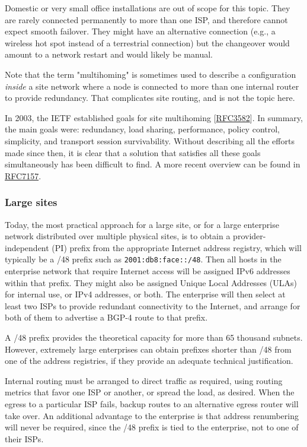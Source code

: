 \documentclass[
]{article}
\begin{document}
Domestic or very small office installations are out of scope for this
topic. They are rarely connected permanently to more than one ISP, and
therefore cannot expect smooth failover. They might have an alternative
connection (e.g., a wireless hot spot instead of a terrestrial
connection) but the changeover would amount to a network restart and
would likely be manual.

Note that the term "multihoming" is sometimes used to describe a
configuration \emph{inside} a site network where a node is connected to
more than one internal router to provide redundancy. That complicates
site routing, and is not the topic here.

In 2003, the IETF established goals for site multihoming
{[}\href{https://www.rfc-editor.org/info/rfc3582}{RFC3582}{]}. In
summary, the main goals were: redundancy, load sharing, performance,
policy control, simplicity, and transport session survivability. Without
describing all the efforts made since then, it is clear that a solution
that satisfies all these goals simultaneously has been difficult to
find. A more recent overview can be found in
\href{https://www.rfc-editor.org/info/rfc7157}{RFC7157}.

\subsubsection{Large sites}\label{large-sites}

Today, the most practical approach for a large site, or for a large
enterprise network distributed over multiple physical sites, is to
obtain a provider-independent (PI) prefix from the appropriate Internet
address registry, which will typically be a /48 prefix such as
\texttt{2001:db8:face::/48}. Then all hosts in the enterprise network
that require Internet access will be assigned IPv6 addresses within that
prefix. They might also be assigned Unique Local Addresses (ULAs) for
internal use, or IPv4 addresses, or both. The enterprise will then
select at least two ISPs to provide redundant connectivity to the
Internet, and arrange for both of them to advertise a BGP-4 route to
that prefix.

A /48 prefix provides the theoretical capacity for more than 65 thousand
subnets. However, extremely large enterprises can obtain prefixes
shorter than /48 from one of the address registries, if they provide an
adequate technical justification.

Internal routing must be arranged to direct traffic as required, using
routing metrics that favor one ISP or another, or spread the load, as
desired. When the egress to a particular ISP fails, backup routes to an
alternative egress router will take over. An additional advantage to the
enterprise is that address renumbering will never be required, since the
/48 prefix is tied to the enterprise, not to one of their ISPs.
\end{document}
